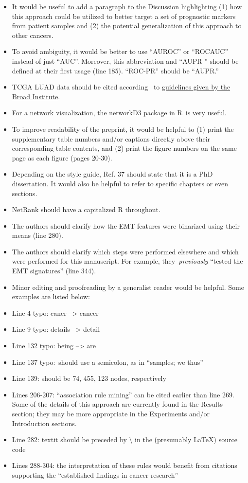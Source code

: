 \documentclass[10pt]{article}
\providecommand{\tightlist}{\setlength{\itemsep}{0pt}\setlength{\parskip}{0pt}}%
\begin{document}
\begin{itemize}
\tightlist
\item
  It would be useful to add a paragraph to the Discussion highlighting
  (1) how this approach could be utilized to better target a set of
  prognostic markers from patient samples and (2) the potential
  generalization of this approach to other cancers.~
\item
  To avoid ambiguity, it would be better to use ``AUROC'' or ``ROCAUC''
  instead of just ``AUC''. Moreover, this abbreviation and ``AUPR ''
  should be defined at their first usage (line 185). ``ROC-PR'' should
  be ``AUPR.''
\item
  TCGA LUAD data should be cited according~ to
  \href{http://gdac.broadinstitute.org/runs/info/DOIs__stddata.html}{guidelines
  given by the Broad Institute}.
\item
  For a network visualization, the
  \href{http://www.htmlwidgets.org/showcase_networkD3.html}{networkD3
  package in R}~is very useful.
\item
  To improve readability of the preprint, it would be helpful to (1)
  print the supplementary table numbers and/or captions directly above
  their corresponding table contents, and (2) print the figure numbers
  on the same page as each figure (pages 20-30).
\item
  Depending on the style guide, Ref. 37 should state that it is a PhD
  dissertation. It would also be helpful to refer to specific chapters
  or even sections.
\item
  NetRank should have a capitalized R throughout.
\item
  The authors should clarify how the EMT features were binarized using
  their means (line 280).
\item
  The authors should clarify which steps were performed elsewhere and
  which were performed for this manuscript. For example,
  they~\emph{previously} ``tested the EMT signatures'' (line 344).
\item
  Minor editing and proofreading by a generalist reader would be
  helpful. Some examples are listed below:
\item
  Line 4 typo: caner --\textgreater{} cancer~
\item
  Line 9 typo: details --\textgreater{} detail
\item
  Line 132 typo: being --\textgreater{} are
\item
  Line 137 typo:~should use a semicolon, as in ``samples; we thus''
\item
  Line 139: should be 74, 455, 123 nodes, respectively
\item
  Lines 206-207: ``association rule mining'' can be cited earlier than
  line 269. Some of the details of this approach are currently found in
  the Results section; they may be more appropriate in the Experiments
  and/or Introduction sections.
\item
  Line 282: textit should be preceded by \textbackslash{} in the
  (presumably LaTeX) source code
\item
  Lines 288-304: the interpretation of these rules would benefit from
  citations supporting the ``established findings in cancer research''~
\end{itemize}

\par\null

\FloatBarrier


\end{document}
